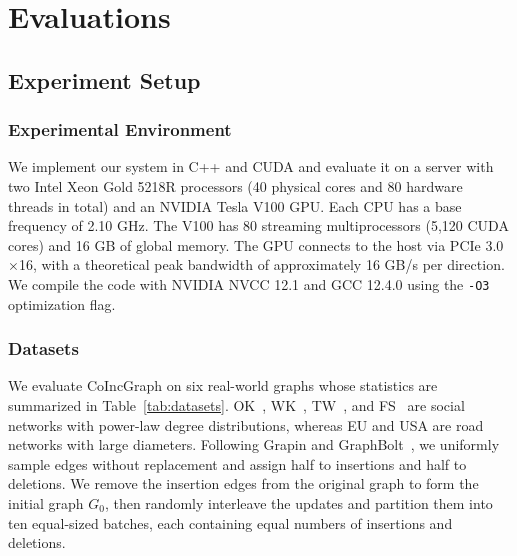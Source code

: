 \section{Evaluations}
\subsection{Experiment Setup}
\subsubsection{Experimental Environment} We implement our system in C++ and CUDA and evaluate it on a server with two Intel Xeon Gold 5218R processors (40 physical cores and 80 hardware threads in total) and an NVIDIA Tesla V100 GPU. Each CPU has a base frequency of 2.10 GHz. The V100 has 80 streaming multiprocessors (5,120 CUDA cores) and 16 GB of global memory. The GPU connects to the host via PCIe 3.0 $\times$16, with a theoretical peak bandwidth of approximately 16 GB/s per direction. We compile the code with NVIDIA NVCC 12.1 and GCC 12.4.0 using the \texttt{-O3} optimization flag.  %
\subsubsection{Datasets} %
We evaluate CoIncGraph on six real-world graphs whose statistics are summarized in Table~\ref{tab:datasets}. OK~\cite{OKFS}, WK~\cite{WK}, TW~\cite{TW}, and FS~\cite{OKFS} are social networks with power-law degree distributions, whereas EU and USA are road networks with large diameters. Following Grapin and GraphBolt~\cite{2025-Grapin,2019-GraphBolt}, we uniformly sample edges without replacement and assign half to insertions and half to deletions. We remove the insertion edges from the original graph to form the initial graph $G_0$, then randomly interleave the updates and partition them into ten equal-sized batches, each containing equal numbers of insertions and deletions.

